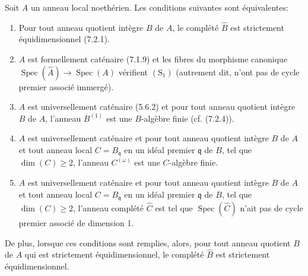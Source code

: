 \begin{theorem}[7.2.5]
\label{IV.2.s7.2.5-fr}
Soit $A$ un anneau local noethérien. Les conditions suivantes sont
équivalentes:
\begin{enumerate}
\item[\textup{a)}] Pour tout anneau quotient intègre $B$ de $A$, le complété
$\widehat B$ est strictement équidimensionnel \textup{(7.2.1)}.
\item[\textup{b)}] $A$ est formellement caténaire \textup{(7.1.9)} et les fibres du morphisme
canonique $\operatorname{Spec}(\widehat A)\to\operatorname{Spec}(A)$
vérifient $(\mathrm S_1)$ \textup{(autrement dit,} n'ont pas de cycle premier associé
immergé\textup{)}.
\item[\textup{c)}] $A$ est universellement caténaire \textup{(5.6.2)} et pour tout anneau
quotient intègre $B$ de $A$, l'anneau $B^{(1)}$ est une $B$-algèbre finie
\textup{(cf. (7.2.4))}.
\item[\textup{d)}] $A$ est universellement caténaire et pour tout anneau quotient
intègre $B$ de $A$ et tout anneau local $C=B_{\mathfrak q}$ en un idéal
premier $\mathfrak q$ de $B$, tel que $\dim(C)\geqslant2$, l'anneau
$C^{(\omega)}$ est une $C$-algèbre finie.
\item[\textup{e)}] $A$ est universellement caténaire et pour tout anneau quotient
intègre $B$ de $A$ et tout anneau local $C=B_{\mathfrak q}$ en un idéal
premier $\mathfrak q$ de $B$, tel que $\dim(C)\geqslant2$, l'anneau complété
$\widehat C$ est tel que $\operatorname{Spec}(\widehat C)$ n'ait pas de
cycle premier associé de dimension 1.
\end{enumerate}

De plus, lorsque ces conditions sont remplies, alors, pour tout anneau
quotient $B$ de $A$ qui est strictement équidimensionnel, le complété
$\widehat B$ est strictement équidimensionnel.
\end{theorem}

